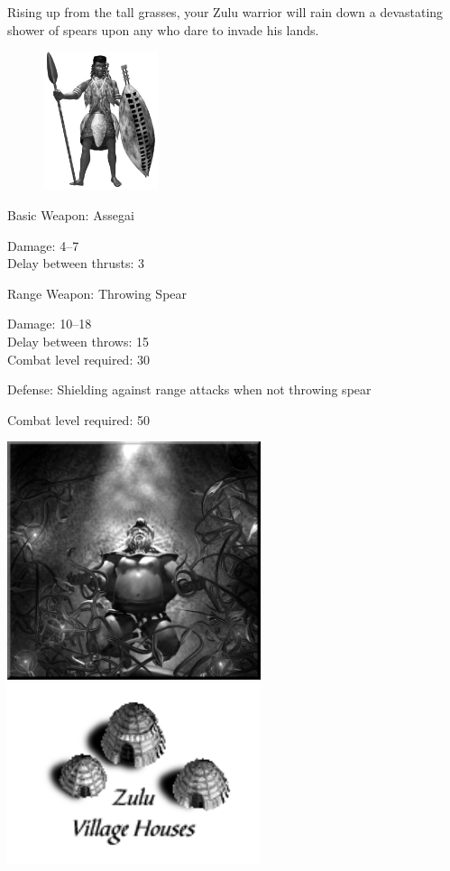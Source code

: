 Rising up from the tall grasses, your Zulu warrior will rain down a devastating shower of spears upon any who dare to invade his lands.
	
\begin{figure}
	\begin{center}
		\vspace{-20pt}
		\includegraphics[width=0.3\textwidth]{Azulu}
	\end{center}
	\vspace{-20pt}
\end{figure}

Basic Weapon: Assegai
\begin{adjustwidth}{1cm}{}
	Damage: 4–7 \\
	Delay between thrusts: 3
\end{adjustwidth}
Range Weapon: Throwing Spear
\begin{adjustwidth}{1cm}{}
	Damage: 10–18 \\
	Delay between throws: 15 \\
	Combat level required: 30
\end{adjustwidth}
Defense: Shielding against range attacks when not throwing spear
\begin{adjustwidth}{1cm}{}
	Combat level required: 50
\end{adjustwidth}

\begin{center}
	\includegraphics[width=74.25mm]{Aoldone}\includegraphics[width=74.25mm]{Izuluhouse}
\end{center}